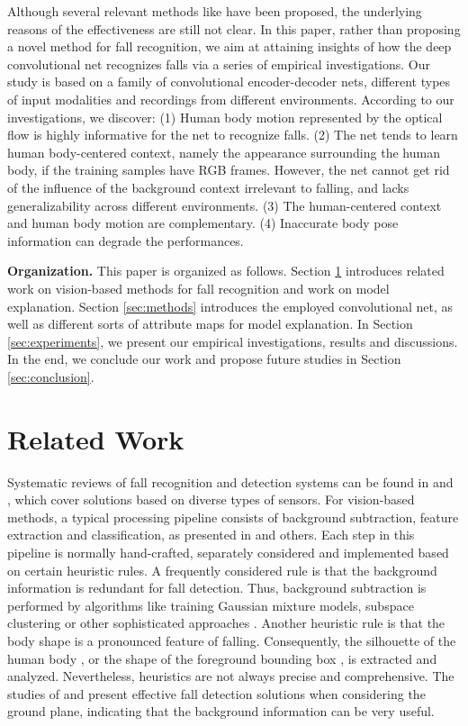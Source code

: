 \documentclass[runningheads]{llncs}
\begin{document}
Although several relevant methods like \cite{nunez2017vision} have been proposed, the underlying reasons of the effectiveness are still not clear. In this paper, rather than proposing a novel method for fall recognition, we aim at attaining insights of how the deep convolutional net recognizes falls via a series of empirical investigations. Our study is based on a family of convolutional encoder-decoder nets, different types of input modalities and recordings from different environments. According to our investigations, we discover: (1) Human body motion represented by the optical flow is highly informative for the net to recognize falls. (2) The net tends to learn human body-centered context, namely the appearance surrounding the human body, if the training samples have RGB frames. However, the net cannot get rid of the influence of the background context irrelevant to falling, and lacks generalizability across different environments. (3) The human-centered context and human body motion are complementary. (4) Inaccurate body pose information can degrade the performances. 


{\bf Organization.} This paper is organized as follows. Section \ref{sec:related_work} introduces related work on vision-based methods for fall recognition and work on model explanation. Section \ref{sec:methods} introduces the employed convolutional net, as well as different sorts of attribute maps for model explanation. In Section \ref{sec:experiments}, we present our empirical investigations, results and discussions. In the end, we conclude our work and propose future studies in Section \ref{sec:conclusion}.




\section{Related Work}
\label{sec:related_work}
Systematic reviews of fall recognition and detection systems can be found in \cite{igual2013challenges} and \cite{mubashir2013survey}, which cover solutions based on diverse types of sensors. For vision-based methods, a typical processing pipeline consists of background subtraction, feature extraction and classification, as presented in \cite{rougier2011robust} \cite{vishwakarma2007automatic} and others. Each step in this pipeline is normally hand-crafted, separately considered and implemented based on certain heuristic rules. A frequently considered rule is that the background information is redundant for fall detection. Thus, background subtraction is performed by algorithms like training Gaussian mixture models, subspace clustering or other sophisticated approaches \cite{piccardi2004background}. Another heuristic rule is that the body shape is a pronounced feature of falling. Consequently, the silhouette of the human body \cite{rougier2011robust} \cite{anderson2006recognizing}, or the shape of the foreground bounding box \cite{vishwakarma2007automatic} \cite{toreyin2005hmm}, is extracted and analyzed. Nevertheless, heuristics are not always precise and comprehensive. The studies of \cite{stone2015fall} and \cite{solbach2017vision} present effective fall detection solutions when considering the ground plane, indicating that the background information can be very useful. 
\end{document}

